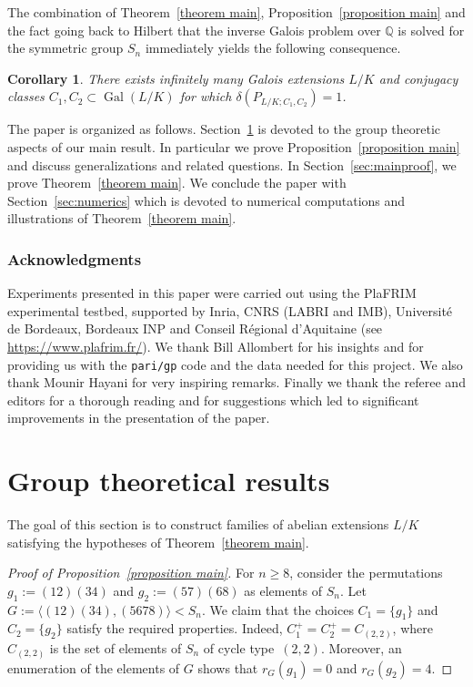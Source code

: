 \documentclass[10pt]{amsart}
\newtheorem{corollary}[X]{Corollary}
\theoremstyle{definition}
\DeclareMathOperator{\Gal}{Gal}
\newcommand{\Q}{\mathbb Q}
\begin{document}
The combination of Theorem~\ref{theorem main}, Proposition~\ref{proposition main} and the fact going back to Hilbert that the inverse Galois problem over $\Q$ is solved for the symmetric group $S_n$ immediately yields the following consequence.

\begin{corollary}\label{cor}
There exists infinitely many Galois extensions $L/K$ and conjugacy classes $C_1,C_2 \subset \Gal(L/K)$ for which $\delta(P_{L/K;C_1,C_2})=1$.
\end{corollary}

The paper is organized as follows. Section~\ref{sec:groups} is devoted to the group theoretic aspects of our main result. In particular we prove Proposition~\ref{proposition main} and discuss generalizations and related questions. In Section~\ref{sec:mainproof}, we prove Theorem~\ref{theorem main}. We conclude the paper with Section~\ref{sec:numerics} which is devoted to numerical computations and illustrations of Theorem~\ref{theorem main}.

\subsubsection*{Acknowledgments}
Experiments presented in this paper were carried out using the PlaFRIM experimental testbed, supported by Inria, CNRS (LABRI and IMB), Université de Bordeaux, Bordeaux INP and Conseil Régional d'Aquitaine (see \url{https://www.plafrim.fr/}). We thank Bill Allombert for his insights and for providing us with the {\tt pari/gp} code and the data needed for this project. We also thank Mounir Hayani for very inspiring remarks. Finally we thank the referee and editors for a thorough reading and for suggestions which led to significant improvements in the presentation of the paper.

\section{Group theoretical results}\label{sec:groups}

The goal of this section is to construct families of abelian extensions $L/K$ satisfying the hypotheses of Theorem~\ref{theorem main}.

\begin{proof}[Proof of Proposition~\ref{proposition main}]
For $n\geq 8$, consider the permutations $g_1:=(12)(34)$ and $g_2:=(57)(68)$ as elements of $S_n$. Let $G:= \langle (12)(34),(5678) \rangle < S_n$. We claim that the choices $C_1=\{g_1\}$ and $C_2=\{g_2\}$ satisfy the required properties. Indeed,
$ C_1^+ = C_2^+=C_{(2,2)} $, where $C_{(2,2)}$ is the set of elements of $S_n$ of cycle type~$(2,2)$. Moreover, an enumeration of the elements of $G$ shows that $r_G(g_1)=0$ and \hbox{$r_G(g_2)=4$}.
\end{proof}
\end{document}
